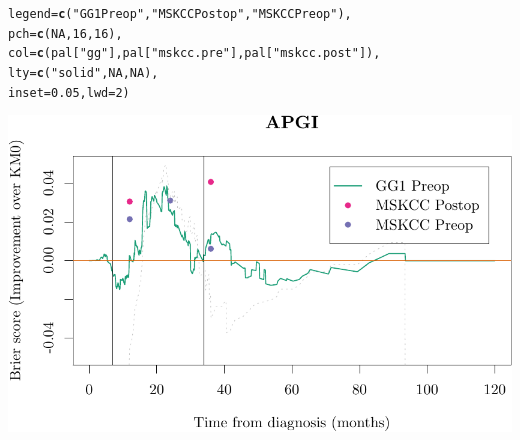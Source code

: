 \documentclass{article}\usepackage[]{graphicx}\usepackage[]{color}
\makeatletter
\def\maxwidth{ %
  \ifdim\Gin@nat@width>\linewidth
    \linewidth
  \else
    \Gin@nat@width
  \fi
}
\newcommand{\hlnum}[1]{\textcolor[rgb]{0.686,0.059,0.569}{#1}}%
\newcommand{\hlstr}[1]{\textcolor[rgb]{0.192,0.494,0.8}{#1}}%
\newcommand{\hlstd}[1]{\textcolor[rgb]{0.345,0.345,0.345}{#1}}%
\newcommand{\hlkwc}[1]{\textcolor[rgb]{0.333,0.667,0.333}{#1}}%
\newcommand{\hlkwd}[1]{\textcolor[rgb]{0.737,0.353,0.396}{\textbf{#1}}}%
\newenvironment{kframe}{%
 \def\at@end@of@kframe{}%
 \ifinner\ifhmode%
  \def\at@end@of@kframe{\end{minipage}}%
  \begin{minipage}{\columnwidth}%
 \fi\fi%
 \def\FrameCommand##1{\hskip\@totalleftmargin \hskip-\fboxsep
 \colorbox{shadecolor}{##1}\hskip-\fboxsep
     \hskip-\linewidth \hskip-\@totalleftmargin \hskip\columnwidth}%
 \MakeFramed {\advance\hsize-\width
   \@totalleftmargin\z@ \linewidth\hsize
   \@setminipage}}%
 {\par\unskip\endMakeFramed%
 \at@end@of@kframe}
\newenvironment{knitrout}{}{} %
\makeatother
\begin{document}
\begin{knitrout}
\begin{kframe}
\begin{alltt}
        \hlkwc{legend} \hlstd{=} \hlkwd{c}\hlstd{(}     \hlstr{"GG1 Preop"}\hlstd{,}    \hlstr{"MSKCC Postop"}\hlstd{,}         \hlstr{"MSKCC Preop"}\hlstd{),}
        \hlkwc{pch} \hlstd{=} \hlkwd{c}\hlstd{(}        \hlnum{NA}\hlstd{,}                     \hlnum{16}\hlstd{,}                             \hlnum{16}\hlstd{),}
        \hlkwc{col} \hlstd{=} \hlkwd{c}\hlstd{(        pal[}\hlstr{"gg"}\hlstd{],              pal[}\hlstr{"mskcc.pre"}\hlstd{],       pal[}\hlstr{"mskcc.post"}\hlstd{]),}
        \hlkwc{lty} \hlstd{=} \hlkwd{c}\hlstd{(}        \hlstr{"solid"}\hlstd{,}                \hlnum{NA}\hlstd{,}                             \hlnum{NA}\hlstd{),}
        \hlkwc{inset} \hlstd{=} \hlnum{0.05}\hlstd{,} \hlkwc{lwd} \hlstd{=} \hlnum{2}\hlstd{)}
\end{alltt}
\end{kframe}

{\centering \includegraphics[width=\maxwidth]{figure/07-prob-bs-paths-plot-apgi-3} 

}



\end{knitrout}
\end{document}
